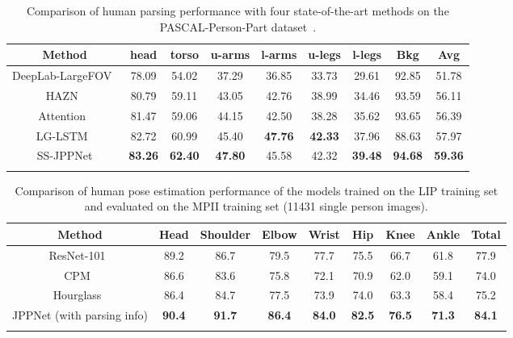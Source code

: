 \documentclass[10pt,journal,compsoc]{IEEEtran}
\begin{document}
\begin{table}[t]
\centering
\scriptsize
\tabcolsep 0.025in 
\vspace{-2mm}
\caption{Comparison of human parsing performance with four state-of-the-art methods on the PASCAL-Person-Part dataset~\cite{chen2014detect}.}
\vspace{-3mm}
\label{tab: pascal}
\begin{tabular}{ccccccccc}
\toprule[0.7pt]
   Method                                     &  head  &  torso  &  u-arms &  l-arms &  u-legs &  l-legs &  Bkg   &  Avg    \\ \hline
   DeepLab-LargeFOV~\cite{chen2016deeplab}      & 78.09  &  54.02  &  37.29  &  36.85  &  33.73  &  29.61  &  92.85 &  51.78  \\
   HAZN~\cite{xia2015zoom}                       & 80.79  &  59.11  &  43.05  &  42.76  &  38.99  &  34.46  &  93.59 &  56.11  \\  
   Attention~\cite{chen2015attention}   & 81.47  &  59.06  &  44.15  &  42.50  &  38.28  &  35.62  &  93.65 &  56.39  \\ 
   LG-LSTM~\cite{liang2015semantic}              & 82.72  &  60.99  &  45.40  &  \textbf{47.76}  &  \textbf{42.33}  &  37.96  &  88.63 &  57.97  \\ \hline
   SS-JPPNet                      & \textbf{83.26}  &  \textbf{62.40}  &  \textbf{47.80}  &  45.58  &  42.32 &  \textbf{39.48}  &  \textbf{94.68} 
                                        &  \textbf{59.36}   \\
\toprule[0.7pt]
\vspace{-6mm}
\end{tabular}
\end{table}


\begin{table*}[t]
\centering
\normalsize
\vspace{-2mm}
\caption{Comparison of human pose estimation performance of the models trained on the LIP training set and evaluated on the MPII training set (11431 single person images).}
\vspace{-3mm}
\label{tab: pose_mpii}
\begin{tabular}{ccccccccc}
\toprule[0.7pt]
   Method                                       & Head  & Shoulder & Elbow & Wrist & Hip  & Knee & Ankle & Total  \\ \hline 
   ResNet-101~\cite{chen2016deeplab}            & 89.2  & 86.7     & 79.5  & 77.7  & 75.5 & 66.7 & 61.8  & 77.9   \\
   CPM~\cite{Wei_2016_CVPR}                     & 86.6  & 83.6     & 75.8  & 72.1  & 70.9 & 62.0 & 59.1  & 74.0   \\
   Hourglass~\cite{newell2016stacked}           & 86.4  & 84.7     & 77.5  & 73.9  & 74.0 & 63.3 & 58.4  & 75.2   \\
   JPPNet (with parsing info)  & \textbf{90.4}  & \textbf{91.7} & \textbf{86.4} & \textbf{84.0} & \textbf{82.5} & \textbf{76.5} & \textbf{71.3} & \textbf{84.1} \\
\toprule[0.7pt]
\vspace{-6mm}
\end{tabular}
\end{table*}
\end{document}
